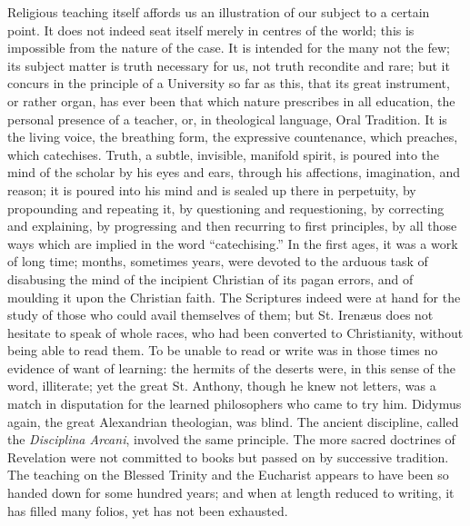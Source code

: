 Religious teaching itself affords us an illustration of our subject
to a certain point. It does not indeed seat itself merely in centres
of the world; this is impossible from the nature of the case. It is
intended for the many not the few; its subject matter is truth
necessary for us, not truth recondite and rare; but it concurs in the
principle of a University so far as this, that its great instrument,
or rather organ, has ever been that which nature prescribes in all
education, the personal presence of a teacher, or, in theological
language, Oral Tradition. It is the living voice, the breathing form,
the expressive countenance, which preaches, which catechises. Truth, a
subtle, invisible, manifold spirit, is poured into the mind of the
scholar by his eyes and ears, through his affections, imagination, and
reason; it is poured into his mind and is sealed up there in
perpetuity, by propounding and repeating it, by questioning and
requestioning, by correcting and explaining, by progressing and then
recurring to first principles, by all those ways which are
implied in the word ``catechising.'' In the first ages, it was
a work of long time; months, sometimes years, were devoted to the
arduous task of disabusing the mind of the incipient Christian of its
pagan errors, and of moulding it upon the Christian faith. The
Scriptures indeed were at hand for the study of those who could avail
themselves of them; but St. Irenæus does not hesitate to speak of
whole races, who had been converted to Christianity, without being
able to read them. To be unable to read or write was in those times no
evidence of want of learning: the hermits of the deserts were, in this
sense of the word, illiterate; yet the great St. Anthony, though he
knew not letters, was a match in disputation for the learned
philosophers who came to try him. Didymus again, the great Alexandrian
theologian, was blind. The ancient discipline, called the \emph{Disciplina
Arcani}, involved the same principle. The more sacred doctrines of
Revelation were not committed to books but passed on by successive
tradition. The teaching on the Blessed Trinity and the Eucharist
appears to have been so handed down for some hundred years; and when
at length reduced to writing, it has filled many folios, yet has not
been exhausted.

